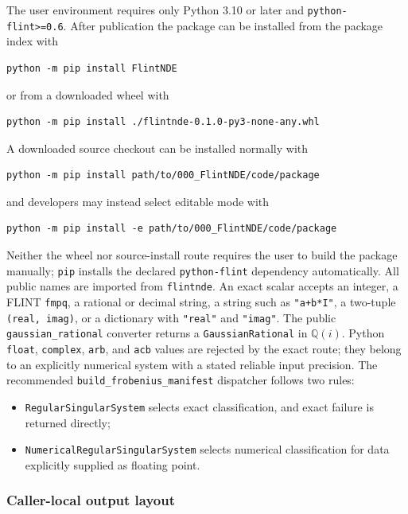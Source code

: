 \documentclass[11pt]{article}
\begin{document}
The user environment requires only Python 3.10 or later and
\texttt{python-flint>=0.6}.  After publication the package can be installed from the package
index with
\begin{verbatim}
python -m pip install FlintNDE
\end{verbatim}
or from a downloaded wheel with
\begin{verbatim}
python -m pip install ./flintnde-0.1.0-py3-none-any.whl
\end{verbatim}
A downloaded source checkout can be installed normally with
\begin{verbatim}
python -m pip install path/to/000_FlintNDE/code/package
\end{verbatim}
and developers may instead select editable mode with
\begin{verbatim}
python -m pip install -e path/to/000_FlintNDE/code/package
\end{verbatim}
Neither the wheel nor source-install route requires the user to build the package manually;
\texttt{pip} installs the declared \texttt{python-flint} dependency automatically.
All public names are imported from \texttt{flintnde}.  An exact scalar accepts an integer,
a FLINT \texttt{fmpq}, a rational or decimal string, a string such as \texttt{"a+b*I"}, a
two-tuple \texttt{(real, imag)}, or a dictionary with \texttt{"real"} and \texttt{"imag"}.
The public \texttt{gaussian\_rational} converter returns a \texttt{GaussianRational} in
$\mathbb Q(i)$.  Python \texttt{float}, \texttt{complex}, \texttt{arb}, and \texttt{acb}
values are rejected by the exact route; they belong to an explicitly numerical system with
a stated reliable input precision.  The recommended
\texttt{build\_frobenius\_manifest} dispatcher follows two rules:
\begin{itemize}
  \item \texttt{RegularSingularSystem} selects exact classification, and exact failure is
  returned directly;
  \item \texttt{NumericalRegularSingularSystem} selects numerical classification for data
  explicitly supplied as floating point.
\end{itemize}

\subsubsection{Caller-local output layout}
\end{document}
